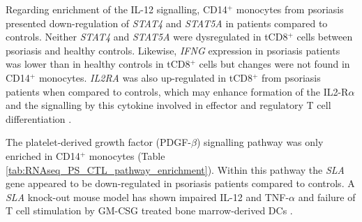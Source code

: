 Regarding enrichment of the IL-12 signalling, CD14$^+$ monocytes from psoriasis presented down-regulation of \textit{STAT4} and \textit{STAT5A} in patients compared to controls. Neither \textit{STAT4} and \textit{STAT5A} were dysregulated in tCD8$^+$ cells between psoriasis and healthy controls. Likewise, \textit{IFNG} expression in psoriasis patients was lower than in healthy controls in tCD8$^+$ cells but changes were not found in CD14$^+$ monocytes. \textit{IL2RA} was also up-regulated in tCD8$^+$ from psoriasis patients when compared to controls, which may enhance formation of the IL2-R$\alpha$ and the signalling by this cytokine involved in effector and regulatory T cell differentiation \parencite{Malek2010}.




The platelet-derived growth factor (PDGF-$\beta$) signalling pathway was only enriched in CD14$^+$ monocytes (Table \ref{tab:RNAseq_PS_CTL_pathway_enrichment}). Within this pathway the \textit{SLA} gene appeared to be down-regulated in psoriasis patients compared to controls. A \textit{SLA} knock-out mouse model has shown impaired IL-12 and TNF-$\alpha$ and failure of T cell stimulation by GM-CSG treated bone marrow-derived DCs \parencite{Liontos2011}.

